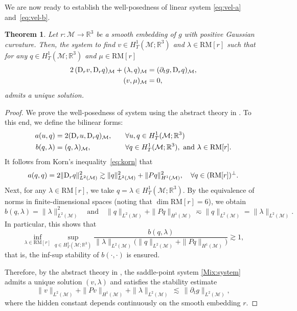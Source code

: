 \documentclass[11pt,a4paper,oneside,reqno]{amsart}
\theoremstyle{definition}
\theoremstyle{plain}
\newtheorem{theorem}{Theorem}
\numberwithin{theorem}{section}
\numberwithin{proposition}{section}
\numberwithin{lemma}{section}
\numberwithin{equation}{section}
\newcommand{\Man}{\mathcal{M}}
\newcommand{\RM}{\mathrm{RM}}
\begin{document}
We are now ready to establish the well-posedness of linear system \eqref{eq:vel-a} and~\eqref{eq:vel-b}.
\begin{theorem}\label{thm:wellpose}
Let \(r:\Man \rightarrow \mathbb{R}^3\) be a smooth embedding of $g$ with positive Gaussian curvature. Then, the system to find $v \in H^1_{T}(\Man; \mathbb{R}^3)$ and $\lambda \in \RM[r]$ such that for any  $q \in  H^1_{T}(\Man; \mathbb{R}^3)$ and $\mu \in \RM[r]$
\begin{subequations}\label{Mix:system}
\begin{align}
2\,({\rm D}_r v, {\rm D}_r q)_{\Man}
+ (\lambda, q)_{\Man} &= (\partial_t g, {\rm D}_r q)_{\Man}, \\
(v, \mu)_{\Man} &= 0,
\end{align}
\end{subequations}
admits a unique solution.
\end{theorem}

\begin{proof}
We prove the well-posedness of system using the abstract theory in \cite{boffi2013mixed}.
To this end, we define the bilinear forms:
\begin{align*}
a(u, q) &= 2({\rm D}_ru, {\rm D}_rq)_{\Man}, 
\quad && \forall u, q \in H^1_T(\Man; \mathbb{R}^3)
\\
b(q, \lambda) &= (q,\lambda)_{\Man}, \quad && \forall q \in H^1_T(\Man; \mathbb{R}^3),
\text{ and } \lambda \in \RM[r]. 
\end{align*}
It follows from Korn's inequality~\eqref{eq:korn} that
\[
a(q, q) = 2 \| {\rm D}_rq \|_{L^2(\Man)}^2 \gtrsim \| q \|_{L^2(\Man)}^2 
+ \|P q\|_{H^1(\Man)}^2
, \quad \forall q \in (\RM[r])^\perp.
\]
Next, for any \( \lambda \in \RM[r] \), we take 
\( q = \lambda \in H^1_T(\Man; \mathbb{R}^3) \). 
By the equivalence of norms in finite-dimensional spaces 
(noting that \( \dim \RM[r] = 6 \)), we obtain
\[
    b(q, \lambda) = \|\lambda\|_{L^2(\Man)}^2 
    \quad \text{and} \quad
    \|q\|_{L^2(\Man)} + \|Pq\|_{H^1(\Man)}
    \eqsim \|q\|_{L^2(\Man)}
    = \|\lambda\|_{L^2(\Man)} .
\]
In particular, this shows that
\[
    \inf_{\lambda \in \RM[r]} 
    \sup_{q \in H^1_{T}(\Man; \mathbb{R}^3)}
    \frac{
        b(q, \lambda)
    }{
        \|\lambda\|_{L^2(\Man)}
        \bigl(\|q\|_{L^2(\Man)} + \|Pq\|_{H^1(\Man)}\bigr)
    }
    \gtrsim 1,
\]
that is, the inf-sup stability of \( b(\cdot, \cdot) \) is ensured.


Therefore, by the abstract theory in \cite{boffi2013mixed}, the saddle-point system \eqref{Mix:system} admits a unique solution \((v,\lambda)\) and satisfies the stability estimate
\[
 \|v\|_{L^2(\Man)} + \|P v\|_{H^1(\Man)} + \|\lambda\|_{L^2(\Man)} \,\lesssim\, \|\partial_t g \|_{L^2(\Man)},
\]
where the hidden constant depends continuously on the smooth embedding \(r\).
\end{proof}
\end{document}
